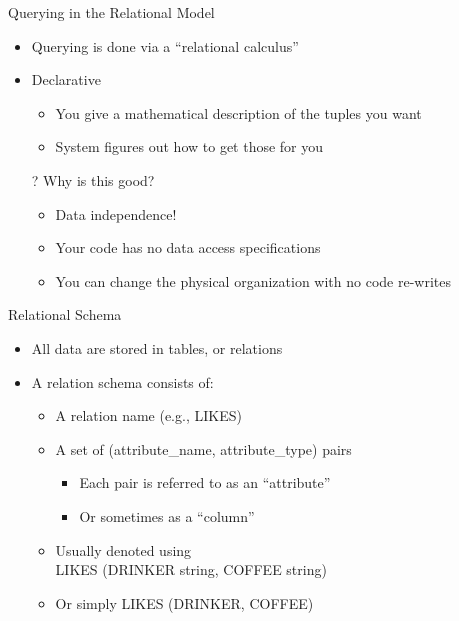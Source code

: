 \documentclass[aspectratio=169]{beamer}
\begin{document}
\begin{frame}{Querying in the Relational Model}

\begin{itemize}
\item Querying is done via a ``relational calculus''
\item Declarative
	\begin{itemize}
	\item You give a mathematical description of the tuples you want
	\item System figures out how to get those for you
	\end{itemize}
\item[?] Why is this good?
	\begin{itemize}
	\item Data independence!
	\item Your code has no data access specifications
	\item You can change the physical organization with no code re-writes	
	\end{itemize}
\end{itemize}
\end{frame}

\begin{frame}{Relational Schema}

\begin{itemize}
\item All data are stored in tables, or relations
\item A relation schema consists of:
	\begin{itemize}
	\item A relation name (e.g., LIKES)
	\item A set of (attribute\_name, attribute\_type) pairs
		\begin{itemize}
		\item Each pair is referred to as an ``attribute''
		\item Or sometimes as a ``column''
		\end{itemize}
	\item Usually denoted using \\
	LIKES (DRINKER string, COFFEE string)
	\item Or simply LIKES (DRINKER, COFFEE)
	\end{itemize}
\end{itemize}
\end{frame}
\end{document}

